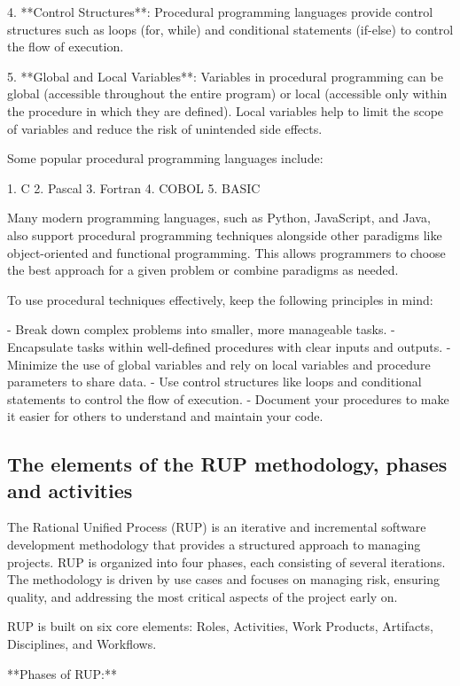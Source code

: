 \documentclass{article}
\begin{document}
4. **Control Structures**: Procedural programming languages provide control structures such as loops (for, while) and conditional statements (if-else) to control the flow of execution.

5. **Global and Local Variables**: Variables in procedural programming can be global (accessible throughout the entire program) or local (accessible only within the procedure in which they are defined). Local variables help to limit the scope of variables and reduce the risk of unintended side effects.

Some popular procedural programming languages include:

1. C
2. Pascal
3. Fortran
4. COBOL
5. BASIC

Many modern programming languages, such as Python, JavaScript, and Java, also support procedural programming techniques alongside other paradigms like object-oriented and functional programming. This allows programmers to choose the best approach for a given problem or combine paradigms as needed.

To use procedural techniques effectively, keep the following principles in mind:

- Break down complex problems into smaller, more manageable tasks.
- Encapsulate tasks within well-defined procedures with clear inputs and outputs.
- Minimize the use of global variables and rely on local variables and procedure parameters to share data.
- Use control structures like loops and conditional statements to control the flow of execution.
- Document your procedures to make it easier for others to understand and maintain your code.


\subsection{The elements of the RUP methodology, phases and activities}

The Rational Unified Process (RUP) is an iterative and incremental software development methodology that provides a structured approach to managing projects. RUP is organized into four phases, each consisting of several iterations. The methodology is driven by use cases and focuses on managing risk, ensuring quality, and addressing the most critical aspects of the project early on.

RUP is built on six core elements: Roles, Activities, Work Products, Artifacts, Disciplines, and Workflows.

**Phases of RUP:**
\end{document}
